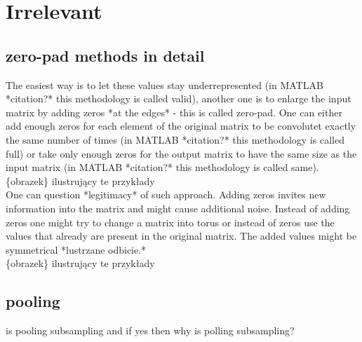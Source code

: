 \documentclass[a4paper,10pt]{report}
\begin{document}
  \chapter{Irrelevant} %
    \section{zero-pad methods in detail}
      The easiest way is to let these values stay underrepresented (in MATLAB *citation?* this methodology is called valid), another one is to enlarge the input matrix by adding zeros *at the edges* - this is called zero-pad. One can either add enough zeros for each element of the original matrix to be convolutet exactly the same number of times (in MATLAB *citation?* this methodology is called full) or take only enough zeros for the output matrix to have the same size as the input matrix (in MATLAB *citation?* this methodology is called same).\\
	  
      \{obrazek\} ilustrujący te przykłady \\
	  
      One can question *legitimacy* of such approach. Adding zeros invites new information into the matrix and might cause additional noise. Instead of adding zeros one might try to change a matrix into torus or instead of zeros use the values that already are present in the original matrix. The added values might be symmetrical *lustrzane odbicie.*\\
	  
      \{obrazek\} ilustrujący te przykłady 
      
    \section{pooling}	  
      is pooling subsampling and if yes then why is polling subsampling?\\

    
\end{document}

